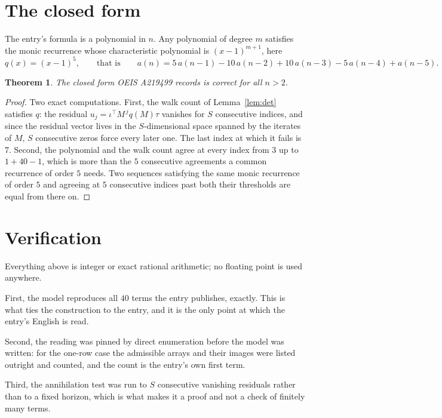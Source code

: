 \documentclass[11pt,a4paper]{article}
\theoremstyle{plain}
\newtheorem{theorem}{Theorem}
\theoremstyle{definition}
\begin{document}
\section{The closed form}

The entry's formula is a polynomial in $n$. Any polynomial of degree $m$ satisfies the monic
recurrence whose characteristic polynomial is $(x-1)^{m+1}$, here
\[
q(x)=(x-1)^{5},\qquad\text{that is}\qquad a(n)=5\,a(n-1) - 10\,a(n-2) + 10\,a(n-3) - 5\,a(n-4) + a(n-5).
\]

\begin{theorem}
The closed form OEIS A219499 records is correct for all $n>2$.
\end{theorem}

\begin{proof}
Two exact computations. First, the walk count of Lemma~\ref{lem:det} satisfies $q$: the
residual $u_j=\iota^{\!\top}M^{\,j}q(M)\tau$ vanishes for $S$ consecutive indices, and
since the residual vector lives in the $S$-dimensional space spanned by the iterates of $M$,
$S$ consecutive zeros force every later one. The last index at which it fails is $7$.
Second, the polynomial and the walk count agree at every index from $3$ up to
$1 + 40 - 1$, which is more than the $5$ consecutive agreements a
common recurrence of order $5$ needs. Two sequences satisfying the same monic recurrence
of order $5$ and agreeing at $5$ consecutive indices past both their thresholds are
equal from there on.
\end{proof}

\section{Verification}

Everything above is integer or exact rational arithmetic; no floating point is used anywhere.

First, the model reproduces all $40$ terms the entry publishes, exactly. This is what
ties the construction to the entry, and it is the only point at which the entry's English is
read.

Second, the reading was pinned by direct enumeration before the model was written: for the
one-row case the admissible arrays and their images were listed outright and counted, and the
count is the entry's own first term.

Third, the annihilation test was run to $S$ consecutive vanishing residuals rather than to a
fixed horizon, which is what makes it a proof and not a check of finitely many terms.
\end{document}
